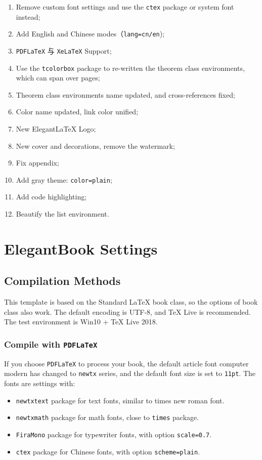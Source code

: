 \documentclass{elegantbook}
\begin{document}
\begin{enumerate}
   \item Remove custom font settings and use the \lstinline{ctex} package or system font instead;
   \item Add English and Chinese modes（\lstinline{lang=cn/en});
   \item \lstinline{PDFLaTeX} 与 \lstinline{XeLaTeX} Support;
   \item Use the \lstinline{tcolorbox} package to re-written the theorem class environments, which can span over pages;
   \item Theorem class environments name updated, and cross-references fixed;
   \item Color name updated, link color unified;
   \item New Elegant\LaTeX{} Logo;
   \item New cover and decorations, remove the watermark;
   \item Fix appendix;
   \item Add gray theme: \lstinline{color=plain};
   \item Add code highlighting;
   \item Beautify the list environment.
\end{enumerate}


\chapter{ElegantBook Settings}

\section{Compilation Methods}
This template is based on the Standard LaTeX book class, so the options of book class also work. The default encoding is UTF-8, and \TeX{} Live is recommended. The test environment is Win10 + \TeX{} Live 2018. 
\subsection[Compile with PDFLaTeX]{Compile with \lstinline{PDFLaTeX}}

If you choose \lstinline{PDFLaTeX} to process your book, the default article font computer modern has changed to \lstinline{newtx} series, and the default font size is set to \lstinline{11pt}. The fonts are settings with:

\begin{itemize}
	\item \lstinline{newtxtext} package for text fonts, similar to times new roman font.
	\item \lstinline{newtxmath} package for math fonts, close to \lstinline{times} package.
	\item \lstinline{FiraMono} package for typewriter fonts, with option \lstinline{scale=0.7}.
	\item \lstinline{ctex} package for Chinese fonts, with option \lstinline{scheme=plain}.
\end{itemize}
\end{document}
